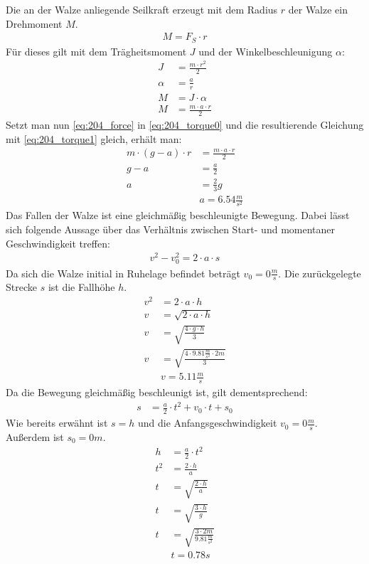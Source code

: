 \documentclass{article}
\begin{document}
	Die an der Walze anliegende Seilkraft erzeugt mit dem Radius $r$ der Walze ein Drehmoment $M$.
	\begin{align}
		M=F_S\cdot r	\label{eq:204_torque0}
	\end{align}
	Für dieses gilt mit dem Trägheitsmoment $J$ und der Winkelbeschleunigung $\alpha$:
	\begin{align}
		J&=\frac{m\cdot r^2}{2}			\nonumber\\
		\alpha&=\frac{a}{r}				\nonumber\\
		M&=J\cdot \alpha				\nonumber\\
		M&=\frac{m\cdot a\cdot r}{2}	\label{eq:204_torque1}
	\end{align}
	Setzt man nun \eqref{eq:204_force} in \eqref{eq:204_torque0} und die resultierende Gleichung mit \eqref{eq:204_torque1} gleich, erhält man:
	\begin{align*}
		m\cdot(g-a)\cdot r&=\frac{m\cdot a\cdot r}{2}\\
		g-a&=\frac{a}{2}\\
		a&=\frac{2}{3}g\\
		&\boxed{a=6.54\frac{m}{s^2}}	\tag{a}\label{eq:204_a}
	\end{align*}
	Das Fallen der Walze ist eine gleichmäßig beschleunigte Bewegung. Dabei lässt sich folgende Aussage über das Verhältnis zwischen Start- und momentaner Geschwindigkeit treffen:
	\begin{align*}
		v^2-v_0^2=2\cdot a\cdot s
	\end{align*}
	Da sich die Walze initial in Ruhelage befindet beträgt $v_0=0\frac{m}{s}$. Die zurückgelegte Strecke $s$ ist die Fallhöhe $h$.
	\begin{align*}
		v^2&=2\cdot a\cdot h\\
		v&=\sqrt{2\cdot a\cdot h}\\
		v&=\sqrt{\frac{4\cdot g \cdot h}{3}}\\
		v&=\sqrt{\frac{4\cdot 9.81\frac{m}{s^2} \cdot 2m}{3}}\\
		&\boxed{v=5.11\frac{m}{s}}	\tag{b}	\label{eq:204_b}
	\end{align*}
	Da die Bewegung gleichmäßig beschleunigt ist, gilt dementsprechend:
	\begin{align*}
		s&=\frac{a}{2}\cdot t^2+v_0\cdot t+s_0
	\end{align*}
	\newpage
	Wie bereits erwähnt ist $s=h$ und die Anfangsgeschwindigkeit $v_0=0\frac{m}{s}$. Außerdem ist $s_0=0m$.
	\begin{align*}
		h&=\frac{a}{2}\cdot t^2\\
		t^2&=\frac{2\cdot h}{a}\\
		t&=\sqrt{\frac{2\cdot h}{a}}\\
		t&=\sqrt{\frac{3\cdot h}{g}}\\
		t&=\sqrt{\frac{3\cdot 2m}{9.81\frac{m}{s^2}}}\\
		&\boxed{t=0.78s}	\tag{c}	\label{eq:204_c}
	\end{align*}
\end{document}
